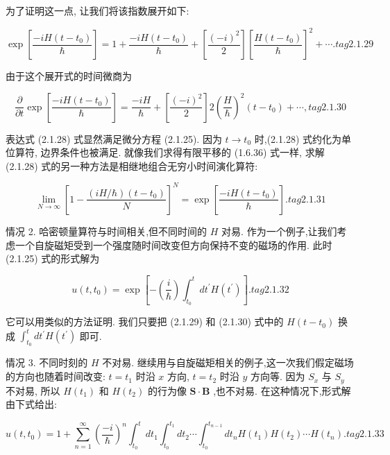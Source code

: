 \documentclass[lang=cn,newtx,10pt,scheme=chinese,thmcnt=section]{elegantbook}
\begin{document}
为了证明这一点, 让我们将该指数展开如下:

$$
\exp \left\lbrack \frac{-{iH}\left( {t - {t}_{0}}\right) }{\hbar }\right\rbrack = 1 + \frac{-{iH}\left( {t - {t}_{0}}\right) }{\hbar } + \left\lbrack \frac{{\left( -i\right) }^{2}}{2}\right\rbrack {\left\lbrack \frac{H\left( {t - {t}_{0}}\right) }{\hbar }\right\rbrack }^{2} + \cdots . tag{2.1.29}
$$

由于这个展开式的时间微商为

$$
\frac{\partial }{\partial t}\exp \left\lbrack \frac{-{iH}\left( {t - {t}_{0}}\right) }{\hbar }\right\rbrack = \frac{-{iH}}{\hbar } + \left\lbrack \frac{{\left( -i\right) }^{2}}{2}\right\rbrack 2{\left( \frac{H}{\hbar }\right) }^{2}\left( {t - {t}_{0}}\right) + \cdots , tag{2.1.30}
$$

表达式 (2.1.28) 式显然满足微分方程 (2.1.25). 因为 $t \rightarrow {t}_{0}$ 时,(2.1.28) 式约化为单位算符, 边界条件也被满足. 就像我们求得有限平移的 (1.6.36) 式一样, 求解 (2.1.28) 式的另一种方法是相继地组合无穷小时间演化算符:

$$
\mathop{\lim }\limits_{{N \rightarrow \infty }}{\left\lbrack 1 - \frac{\left( {{iH}/\hbar }\right) \left( {t - {t}_{0}}\right) }{N}\right\rbrack }^{N} = \exp \left\lbrack \frac{-{iH}\left( {t - {t}_{0}}\right) }{\hbar }\right\rbrack . tag{2.1.31}
$$

情况 2. 哈密顿量算符与时间相关,但不同时间的 $H$ 对易. 作为一个例子,让我们考虑一个自旋磁矩受到一个强度随时间改变但方向保持不变的磁场的作用. 此时 (2.1.25) 式的形式解为

$$
u\left( {t,{t}_{0}}\right) = \exp \left\lbrack {-\left( \frac{i}{\hbar }\right) {\int }_{{t}_{0}}^{t}d{t}^{\prime }H\left( {t}^{\prime }\right) }\right\rbrack . tag{2.1.32}
$$

它可以用类似的方法证明. 我们只要把 (2.1.29) 和 (2.1.30) 式中的 $H\left( {t - {t}_{0}}\right)$ 换成 ${\int }_{{t}_{0}}^{t}d{t}^{\prime }H\left( {t}^{\prime }\right)$ 即可.

情况 3. 不同时刻的 $H$ 不对易. 继续用与自旋磁矩相关的例子,这一次我们假定磁场的方向也随着时间改变: $t = {t}_{1}$ 时沿 $x$ 方向, $t = {t}_{2}$ 时沿 $y$ 方向等. 因为 ${S}_{x}$ 与 ${S}_{y}$ 不对易, 所以 $H\left( {t}_{1}\right)$ 和 $H\left( {t}_{2}\right)$ 的行为像 $\mathbf{S} \cdot \mathbf{B}$ ,也不对易. 在这种情况下,形式解由下式给出:

$$
u\left( {t,{t}_{0}}\right) = 1 + \mathop{\sum }\limits_{{n = 1}}^{\infty }{\left( \frac{-i}{\hbar }\right) }^{n}{\int }_{{t}_{0}}^{t}d{t}_{1}{\int }_{{t}_{0}}^{{t}_{1}}d{t}_{2}\cdots {\int }_{{t}_{0}}^{{t}_{n - 1}}d{t}_{n}H\left( {t}_{1}\right) H\left( {t}_{2}\right) \cdots H\left( {t}_{n}\right) . tag{2.1.33}
$$
\end{document}
